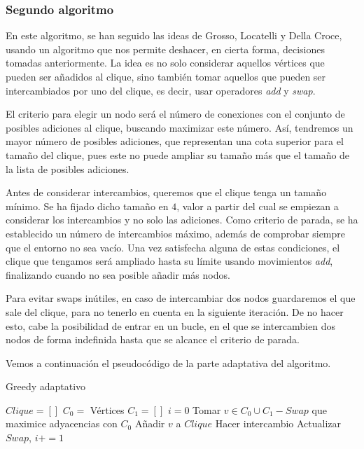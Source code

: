 \subsubsection{Segundo algoritmo}

En este algoritmo, se han seguido las ideas de Grosso, Locatelli y Della Croce, usando un algoritmo
que nos permite deshacer, en cierta forma, decisiones tomadas anteriormente. La idea es no solo
considerar aquellos vértices que pueden ser añadidos al clique, sino también tomar aquellos que
pueden ser intercambiados por uno del clique, es decir, usar operadores \textit{add} y \textit{swap}.

El criterio para elegir un nodo será el número de conexiones con el conjunto de posibles adiciones
al clique, buscando maximizar este número. Así, tendremos un mayor número de posibles adiciones, que
representan una cota superior para el tamaño del clique, pues este no puede ampliar su tamaño
más que el tamaño de la lista de posibles adiciones.

Antes de considerar intercambios, queremos que el clique tenga un tamaño mínimo. Se ha fijado
dicho tamaño en $4$, valor a partir del cual se empiezan a considerar los intercambios y no
solo las adiciones. Como criterio de parada, se ha establecido un número de intercambios máximo,
además de comprobar siempre que el entorno no sea vacío. Una vez satisfecha alguna de estas
condiciones, el clique que tengamos será ampliado hasta su límite usando movimientos \textit{add},
finalizando cuando no sea posible añadir más nodos.

Para evitar swaps inútiles, en caso de intercambiar dos nodos guardaremos el que
sale del clique, para no tenerlo en cuenta en la siguiente iteración. De no hacer esto, cabe la
posibilidad de entrar en un bucle, en el que se intercambien dos nodos de forma indefinida
hasta que se alcance el criterio de parada.

Vemos a continuación el pseudocódigo de la parte adaptativa del algoritmo.


\begin{algorithm}[H]
\caption{Greedy adaptativo}
  \begin{algorithmic}
  \State $Clique = [ ]$
  \State $C_0 = $ Vértices
  \State $C_1 = [ ]$
  \State $i = 0$
  \Repeat
    \State Tomar $v \in C_0 \cup C_1 - Swap$ que maximice adyacencias con $C_0$
      \State Añadir $v$ a $Clique$
    \Else
      \State Hacer intercambio
      \State Actualizar $Swap$, $i += 1$
    \EndIf
  \end{algorithmic}
\end{algorithm}


